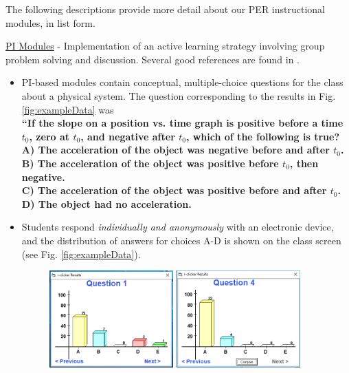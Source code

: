 \documentclass[../../../main.tex]{subfiles}
\begin{document}
The following descriptions provide more detail about our PER instructional modules, in list form.

\underline{PI Modules} - Implementation of an active learning strategy involving group problem solving and discussion.  Several good references are found in \cite{mazur2013peer} \cite{AAPTPI} \cite{PhysPort}.
\begin{itemize}
\item PI-based modules contain conceptual, multiple-choice questions for the class about a physical system.  The question corresponding to the results in Fig. \ref{fig:exampleData} was \\ \vspace{0.5cm} \textbf{``If the slope on a position vs. time graph is positive before a time $t_0$, zero at $t_0$, and negative after $t_0$, which of the following is true? \\ \vspace{0.5cm} A) The acceleration of the object was negative before and after $t_0$.  \\ B) The acceleration of the object was positive before $t_0$, then negative. \\ C) The acceleration of the object was positive before and after $t_0$. \\ D) The object had no acceleration.}
\item Students respond \textit{individually and anonymously} with an electronic device, and the distribution of answers for choices A-D is shown on the class screen (see Fig. \ref{fig:exampleData}).
\begin{figure}
\centering
\includegraphics[width=0.45\textwidth,trim=0.25cm 1cm 0.15cm 2cm,clip=true]{FirstData.PNG}
\includegraphics[width=0.45\textwidth,trim=0.25cm 1cm 0.15cm 2cm,clip=true]{SecondData.PNG}

\end{figure}
\end{itemize}
\end{document}
